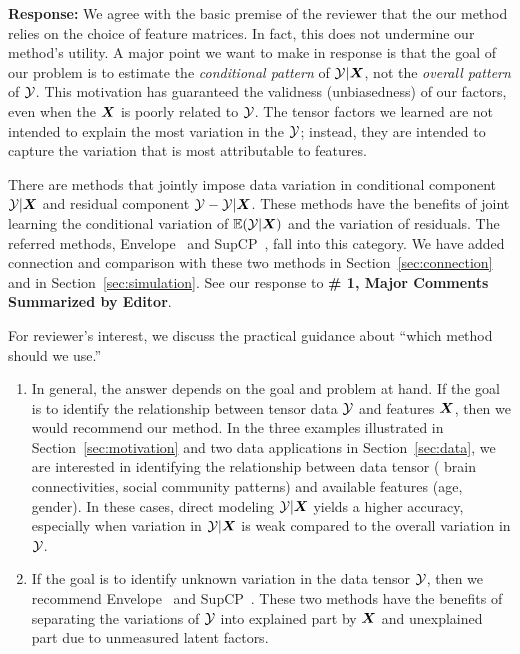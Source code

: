 \documentclass[11pt]{article}
\theoremstyle{plain}
\theoremstyle{definition}
\begin{document}
\begin{enumerate}[wide, labelwidth=!, labelindent=0pt]
    \textbf{Response:} We agree with the basic premise of the reviewer that the our method relies on the choice of feature matrices. In fact, this does not undermine our method's utility. A major point we want to make in response is that the goal of our problem is to estimate the {\it conditional pattern} of $\mathcal{Y}|\bm X$, not the {\it overall pattern} of $\mathcal{Y}$. This motivation has guaranteed the validness (unbiasedness) of our factors, even when the $\bm X$ is poorly related to $\mathcal{Y}$. The tensor factors we learned are not intended to explain the most variation in the $\mathcal{Y}$; instead, they are intended to capture the variation that is most attributable to features. 
    
    There are methods that jointly impose data variation in conditional component $\mathcal{Y}|\bm X$ and residual component $\mathcal{Y}-\mathcal{Y}|\bm X$. These methods have the benefits of joint learning the conditional variation of $\mathbb{E}(\mathcal{Y}|\bm X)$ and the variation of residuals. The referred methods, Envelope~\citep{li2017parsimonious} and SupCP~\citep{lock2018supervised}, fall into this category. We have added connection and comparison with these two methods in  Section~\ref{sec:connection} and in Section~\ref{sec:simulation}. See our response to {\bf \# 1, Major Comments Summarized by Editor}. 

For reviewer's interest, we discuss the practical guidance about ``which method should we use.'' 
\begin{enumerate}
    \item In general, the answer depends on the goal and problem at hand. If the goal is to identify the relationship between tensor data $\mathcal{Y}$ and features $\bm X$, then we would recommend our method. In the three examples  illustrated in Section~\ref{sec:motivation} and two data applications in Section~\ref{sec:data}, we are interested in identifying the relationship between data tensor ( brain connectivities, social community patterns) and available features (age, gender). In these cases, direct modeling $\mathcal{Y}|\bm X$ yields a higher accuracy, especially when variation in $\mathcal{Y}|\bm X$ is weak compared to the overall variation in $\mathcal{Y}$. 
    
    \item If the goal is to identify unknown variation in the data tensor $\mathcal{Y}$, then we recommend Envelope~\citep{li2017parsimonious} and SupCP~\citep{lock2018supervised}. These two methods have the benefits of separating the variations of $\mathcal{Y}$ into explained part by $\bm X$ and unexplained part due to unmeasured latent factors. 
    

\end{enumerate}
\end{enumerate}
\end{document}
